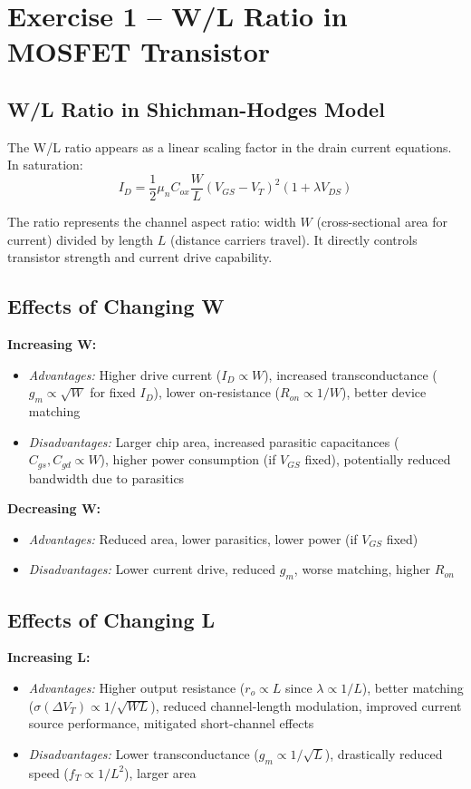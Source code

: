\documentclass[main.tex]{subfiles}
\begin{document}
\section{Exercise 1 – W/L Ratio in MOSFET Transistor}

\subsection*{W/L Ratio in Shichman-Hodges Model}

The W/L ratio appears as a linear scaling factor in the drain current equations. In saturation:
$$I_D = \frac{1}{2} \mu_n C_{ox} \frac{W}{L} (V_{GS} - V_T)^2 (1 + \lambda V_{DS})$$

The ratio represents the channel aspect ratio: width $W$ (cross-sectional area for current) divided by length $L$ (distance carriers travel). It directly controls transistor strength and current drive capability.

\subsection*{Effects of Changing W}

\textbf{Increasing W:}
\begin{itemize}
    \item \textit{Advantages:} Higher drive current ($I_D \propto W$), increased transconductance ($g_m \propto \sqrt{W}$ for fixed $I_D$), lower on-resistance ($R_{on} \propto 1/W$), better device matching
    \item \textit{Disadvantages:} Larger chip area, increased parasitic capacitances ($C_{gs}, C_{gd} \propto W$), higher power consumption (if $V_{GS}$ fixed), potentially reduced bandwidth due to parasitics
\end{itemize}

\textbf{Decreasing W:}
\begin{itemize}
    \item \textit{Advantages:} Reduced area, lower parasitics, lower power (if $V_{GS}$ fixed)
    \item \textit{Disadvantages:} Lower current drive, reduced $g_m$, worse matching, higher $R_{on}$
\end{itemize}

\subsection*{Effects of Changing L}

\textbf{Increasing L:}
\begin{itemize}
    \item \textit{Advantages:} Higher output resistance ($r_o \propto L$ since $\lambda \propto 1/L$), better matching ($\sigma(\Delta V_T) \propto 1/\sqrt{WL}$), reduced channel-length modulation, improved current source performance, mitigated short-channel effects
    \item \textit{Disadvantages:} Lower transconductance ($g_m \propto 1/\sqrt{L}$), drastically reduced speed ($f_T \propto 1/L^2$), larger area
\end{itemize}
\end{document}
